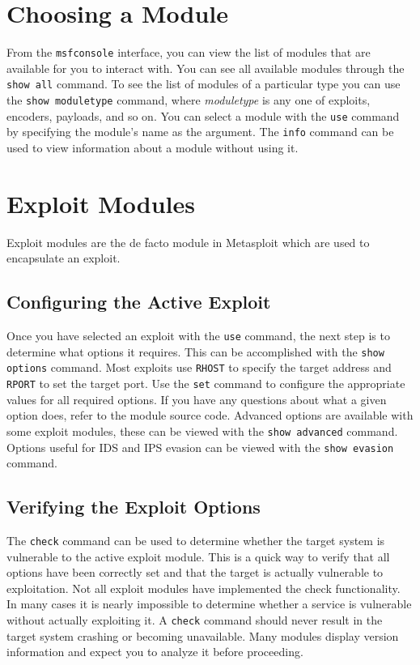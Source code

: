 \documentclass{report}
\begin{document}
	\section{Choosing a Module}

\par
From the \texttt{msfconsole} interface, you can view the list of modules that
are available for you to interact with. You can see all available modules
through the \texttt{show all} command. To see the list of modules of a
particular type you can use the \texttt{show moduletype} command, where
\textit{moduletype} is any one of exploits, encoders, payloads, and so on. You
can select a module with the \texttt{use} command by specifying the module's
name as the argument. The \texttt{info} command can be used to view information
about a module without using it.

	\section{Exploit Modules}

\par
Exploit modules are the de facto module in Metasploit which are used to
encapsulate an exploit.

		\subsection{Configuring the Active Exploit}

\par
Once you have selected an exploit with the \texttt{use} command, the next step
is to determine what options it requires. This can be accomplished with the
\texttt{show options} command. Most exploits use \texttt{RHOST} to specify the
target address and \texttt{RPORT} to set the target port. Use the \texttt{set}
command to configure the appropriate values for all required options. If you
have any questions about what a given option does, refer to the module source
code. Advanced options are available with some exploit modules, these can be
viewed with the \texttt{show advanced} command. Options useful for IDS and IPS
evasion can be viewed with the \texttt{show evasion} command.

		\subsection{Verifying the Exploit Options}

\par	
The \texttt{check} command can be used to determine whether the target system is
vulnerable to the active exploit module. This is a quick way to verify that all
options have been correctly set and that the target is actually vulnerable to
exploitation. Not all exploit modules have implemented the check functionality.
In many cases it is nearly impossible to determine whether a service is
vulnerable without actually exploiting it. A \texttt{check} command should never
result in the target system crashing or becoming unavailable. Many modules
display version information and expect you to analyze it before proceeding.
\end{document}
